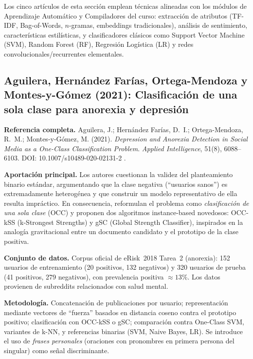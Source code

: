 \documentclass[journal]{IEEEtran}
\begin{document}
Los cinco artículos de esta sección emplean técnicas alineadas con los módulos de Aprendizaje Automático y Compiladores del curso: extracción de atributos (TF-IDF, Bag-of-Words, $n$-gramas, embeddings tradicionales), análisis de sentimiento, características estilísticas, y clasificadores clásicos como Support Vector Machine (SVM), Random Forest (RF), Regresión Logística (LR) y redes convolucionales/recurrentes elementales.

\subsection{Aguilera, Hernández Farías, Ortega-Mendoza y Montes-y-Gómez (2021): Clasificación de una sola clase para anorexia y depresión}

\textbf{Referencia completa.} Aguilera, J.; Hernández Farías, D.~I.; Ortega-Mendoza, R.~M.; Montes-y-Gómez, M. (2021). \emph{Depression and Anorexia Detection in Social Media as a One-Class Classification Problem}. \textit{Applied Intelligence}, 51(8), 6088--6103. DOI: 10.1007/s10489-020-02131-2 \cite{aguilera2021oneclass}.

\textbf{Aportación principal.} Los autores cuestionan la validez del planteamiento binario estándar, argumentando que la clase negativa (``usuarios sanos'') es extremadamente heterogénea y que construir un modelo representativo de ella resulta impráctico. En consecuencia, reformulan el problema como \emph{clasificación de una sola clase} (OCC) y proponen dos algoritmos instance-based novedosos: OCC-kSS (k-Strongest Strengths) y gSC (Global Strength Classifier), inspirados en la analogía gravitacional entre un documento candidato y el prototipo de la clase positiva.

\textbf{Conjunto de datos.} Corpus oficial de eRisk~2018 Tarea~2 (anorexia): 152 usuarios de entrenamiento (20 positivos, 132 negativos) y 320 usuarios de prueba (41 positivos, 279 negativos), con prevalencia positiva $\approx 13\%$. Los datos provienen de subreddits relacionados con salud mental.

\textbf{Metodología.} Concatenación de publicaciones por usuario; representación mediante vectores de ``fuerza'' basados en distancia coseno contra el prototipo positivo; clasificación con OCC-kSS o gSC; comparación contra One-Class SVM, variantes de k-NN, y referencias binarias (SVM, Naive Bayes, LR). Se introduce el uso de \emph{frases personales} (oraciones con pronombres en primera persona del singular) como señal discriminante.
\end{document}
